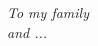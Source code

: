 \newpage\null\thispagestyle{empty}\newpage
\thispagestyle{empty}
\begin{flushright}
\null{}
{\em To my family} \\
{\em and ...}
\null
\end{flushright}